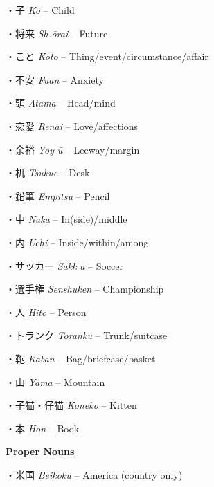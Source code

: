 \par{・子  \emph{Ko }– Child }
 
\par{・将来  \emph{Sh }\emph{ōrai }– Future }
 
\par{・こと  \emph{Koto }– Thing\slash event\slash circumstance\slash affair }
 
\par{・不安  \emph{Fuan }– Anxiety }
 
\par{・頭  \emph{Atama }– Head\slash mind }
 
\par{・恋愛  \emph{Ren\textquotesingle ai }– Love\slash affections }
 
\par{・余裕  \emph{Yoy }\emph{ū }– Leeway\slash margin }
 
\par{・机  \emph{Tsukue }– Desk }
 
\par{・鉛筆  \emph{Empitsu }– Pencil }
 
\par{・中  \emph{Naka }– In(side)\slash middle }
 
\par{・内  \emph{Uchi }– Inside\slash within\slash among }
 
\par{・サッカー  \emph{Sakk }\emph{ā }– Soccer }
 
\par{・選手権  \emph{Senshuken }– Championship }
 
\par{・人  \emph{Hito }– Person }
 
\par{・トランク  \emph{Toranku }– Trunk\slash suitcase }
 
\par{・鞄  \emph{Kaban }– Bag\slash briefcase\slash basket }
 
\par{・山  \emph{Yama }– Mountain }
 
\par{・子猫・仔猫  \emph{Koneko }– Kitten }
 
\par{・本  \emph{Hon }– Book }
 
\par{\textbf{Proper Nouns }}
 
\par{・米国  \emph{Beikoku }– America (country only) }
 
